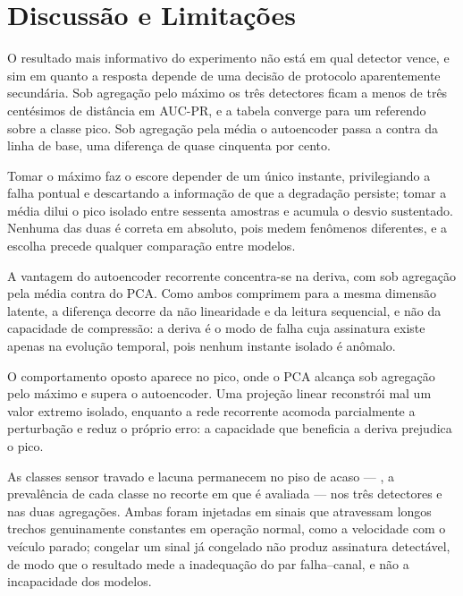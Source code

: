 \documentclass[conference]{IEEEtran}
\begin{document}
\section{Discussão e Limitações}


O resultado mais informativo do experimento não está em qual detector vence, e sim em quanto a resposta depende de uma decisão de protocolo aparentemente secundária.
Sob agregação pelo máximo os três detectores ficam a menos de três centésimos de distância em AUC-PR, e a tabela converge para um referendo sobre a classe pico.
Sob agregação pela média o autoencoder passa a \ResultAutoencoderAucPrMean{} contra \ResultLimiarAucPrMean{} da linha de base, uma diferença de quase cinquenta por cento.

Tomar o máximo faz o escore depender de um único instante, privilegiando a falha pontual e descartando a informação de que a degradação persiste; tomar a média dilui o pico isolado entre sessenta amostras e acumula o desvio sustentado.
Nenhuma das duas é correta em absoluto, pois medem fenômenos diferentes, e a escolha precede qualquer comparação entre modelos.


A vantagem do autoencoder recorrente concentra-se na deriva, com \ResultAutoencoderDerivaMean{} sob agregação pela média contra \ResultPcaDerivaMean{} do PCA.
Como ambos comprimem para a mesma dimensão latente, a diferença decorre da não linearidade e da leitura sequencial, e não da capacidade de compressão: a deriva é o modo de falha cuja assinatura existe apenas na evolução temporal, pois nenhum instante isolado é anômalo.

O comportamento oposto aparece no pico, onde o PCA alcança \ResultPcaPicoMax{} sob agregação pelo máximo e supera o autoencoder.
Uma projeção linear reconstrói mal um valor extremo isolado, enquanto a rede recorrente acomoda parcialmente a perturbação e reduz o próprio erro: a capacidade que beneficia a deriva prejudica o pico.


As classes sensor travado e lacuna permanecem no piso de acaso --- \ResultChanceAucPr{}, a prevalência de cada classe no recorte em que é avaliada --- nos três detectores e nas duas agregações.
Ambas foram injetadas em sinais que atravessam longos trechos genuinamente constantes em operação normal, como a velocidade com o veículo parado; congelar um sinal já congelado não produz assinatura detectável, de modo que o resultado mede a inadequação do par falha--canal, e não a incapacidade dos modelos.
\end{document}
